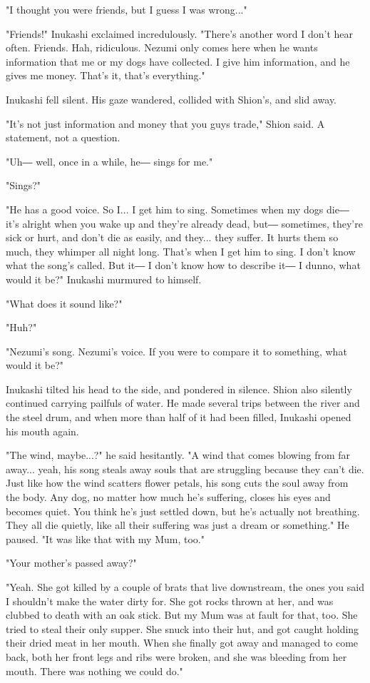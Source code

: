 "I thought you were friends, but I guess I was wrong..."

"Friends!" Inukashi exclaimed incredulously. "There's another word I
don't hear often. Friends. Hah, ridiculous. Nezumi only comes here when
he wants information that me or my dogs have collected. I give him
information, and he gives me money. That's it, that's everything."

Inukashi fell silent. His gaze wandered, collided with Shion's, and slid
away.

"It's not just information and money that you guys trade," Shion said. A
statement, not a question.

"Uh― well, once in a while, he― sings for me."

"Sings?"

"He has a good voice. So I... I get him to sing. Sometimes when my dogs
die― it's alright when you wake up and they're already dead, but―
sometimes, they're sick or hurt, and don't die as easily, and they...
they suffer. It hurts them so much, they whimper all night long. That's
when I get him to sing. I don't know what the song's called. But it― I
don't know how to describe it― I dunno, what would it be?" Inukashi
murmured to himself.

"What does it sound like?"

"Huh?"

"Nezumi's song. Nezumi's voice. If you were to compare it to something,
what would it be?"

Inukashi tilted his head to the side, and pondered in silence. Shion
also silently continued carrying pailfuls of water. He made several
trips between the river and the steel drum, and when more than half of
it had been filled, Inukashi opened his mouth again.

"The wind, maybe...?" he said hesitantly. "A wind that comes blowing
from far away... yeah, his song steals away souls that are struggling
because they can't die. Just like how the wind scatters flower petals,
his song cuts the soul away from the body. Any dog, no matter how much
he's suffering, closes his eyes and becomes quiet. You think he's just
settled down, but he's actually not breathing. They all die quietly,
like all their suffering was just a dream or something." He paused. "It
was like that with my Mum, too."

"Your mother's passed away?"

"Yeah. She got killed by a couple of brats that live downstream, the
ones you said I shouldn't make the water dirty for. She got rocks thrown
at her, and was clubbed to death with an oak stick. But my Mum was at
fault for that, too. She tried to steal their only supper. She snuck
into their hut, and got caught holding their dried meat in her mouth.
When she finally got away and managed to come back, both her front legs
and ribs were broken, and she was bleeding from her mouth. There was
nothing we could do."

